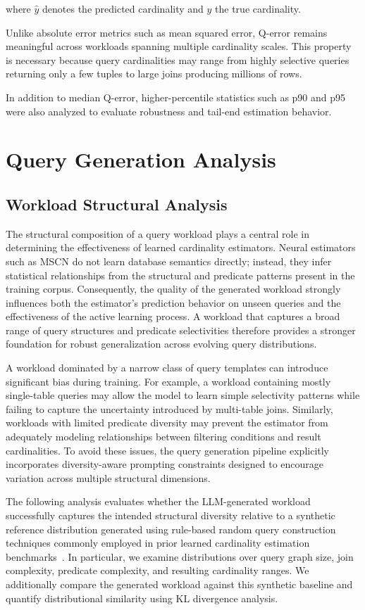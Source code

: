where $\hat{y}$ denotes the predicted cardinality and $y$ the true cardinality.

Unlike absolute error metrics such as mean squared error, Q-error remains meaningful across workloads spanning multiple cardinality scales. This property is necessary because query cardinalities may range from highly selective queries returning only a few tuples to large joins producing millions of rows.

In addition to median Q-error, higher-percentile statistics such as p90 and p95 were also analyzed to evaluate robustness and tail-end estimation behavior.

\section{Query Generation Analysis}

\subsection{Workload Structural Analysis}

The structural composition of a query workload plays a central role in determining the effectiveness of learned cardinality estimators. Neural estimators such as MSCN do not learn database semantics directly; instead, they infer statistical relationships from the structural and predicate patterns present in the training corpus. Consequently, the quality of the generated workload strongly influences both the estimator’s prediction behavior on unseen queries and the effectiveness of the active learning process. A workload that captures a broad range of query structures and predicate selectivities therefore provides a stronger foundation for robust generalization across evolving query distributions.

A workload dominated by a narrow class of query templates can introduce significant bias during training. For example, a workload containing mostly single-table queries may allow the model to learn simple selectivity patterns while failing to capture the uncertainty introduced by multi-table joins. Similarly, workloads with limited predicate diversity may prevent the estimator from adequately modeling relationships between filtering conditions and result cardinalities. To avoid these issues, the query generation pipeline explicitly incorporates diversity-aware prompting constraints designed to encourage variation across multiple structural dimensions.

The following analysis evaluates whether the LLM-generated workload successfully captures the intended structural diversity relative to a synthetic reference distribution generated using rule-based random query construction techniques commonly employed in prior learned cardinality estimation benchmarks~\cite{leis2015how}. In particular, we examine distributions over query graph size, join complexity, predicate complexity, and resulting cardinality ranges. We additionally compare the generated workload against this synthetic baseline and quantify distributional similarity using KL divergence analysis.

